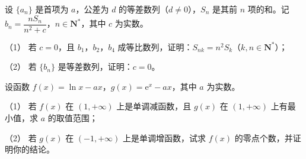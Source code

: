 \begin{question}
设 $\{a_n\}$ 是首项为 $a$，公差为 $d$ 的等差数列（$d\neq0$），$S_n$ 是其前 $n$ 项的和。记 $b_n=\dfrac{nS_n}{n^2+c}$，$n\in\mathbf N^*$，其中 $c$ 为实数。

（1） 若 $c=0$，且 $b_1$，$b_2$，$b_4$ 成等比数列，证明：$S_{nk}=n^2S_k$（$k,n\in\mathbf N^*$）；

（2） 若 $\{b_n\}$ 是等差数列，证明：$c=0$。

\end{question}
\begin{question}
设函数 $f(x)=\ln x-ax$，$g(x)=\mathrm e^x-ax$，其中 $a$ 为实数。

（1） 若 $f(x)$ 在 $(1,+\infty)$ 上是单调减函数，且 $g(x)$ 在 $(1,+\infty)$ 上有最小值，求 $a$ 的取值范围；

（2） 若 $g(x)$ 在 $(-1,+\infty)$ 上是单调增函数，试求 $f(x)$ 的零点个数，并证明你的结论。

\end{question}

